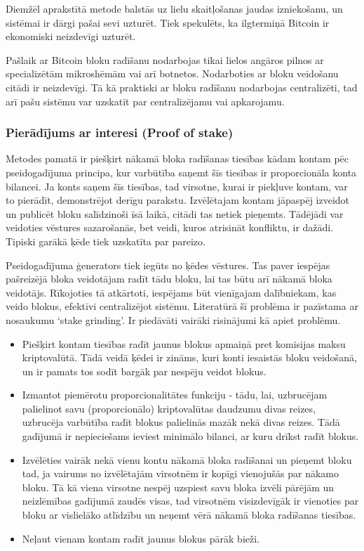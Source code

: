 Diemžēl aprakstītā metode balstās uz lielu skaitļošanas jaudas izniekošanu, un sistēmai ir dārgi pašai sevi uzturēt. Tiek spekulēts, ka ilgtermiņā Bitcoin ir ekonomiski neizdevīgi uzturēt. %

Pašlaik ar Bitcoin bloku radīšanu nodarbojas tikai lielos angāros pilnos ar specializētām mikroshēmām vai arī botnetos. Nodarboties ar bloku veidošanu citādi ir neizdevīgi. Tā kā praktiski ar bloku radīšanu nodarbojas centralizēti, tad arī pašu sistēmu var uzskatīt par centralizējamu vai apkarojamu.

\subsubsection{Pierādījums ar interesi (Proof of stake)}
Metodes pamatā ir piešķirt nākamā bloka radīšanas tiesības kādam kontam pēc pseidogadījuma principa, kur varbūtība saņemt šīs tiesības ir proporcionāla konta bilancei. Ja konts saņem šīs tiesības, tad virsotne, kurai ir piekļuve kontam, var to pierādīt, demonstrējot derīgu parakstu. Izvēlētajam kontam jāpaspēj izveidot un publicēt bloku salīdzinoši īsā laikā, citādi tas netiek pieņemts. Tādējādi var veidoties vēstures sazarošanās, bet veidi, kuros atrisināt konfliktu, ir dažādi. Tipiski garākā ķēde tiek uzskatīta par pareizo.

Pseidogadījuma ģenerators tiek iegūts no ķēdes vēstures. Tas paver iespējas pašreizējā bloka veidotājam radīt tādu bloku, lai tas būtu arī nākamā bloka veidotājs. Rīkojoties tā atkārtoti, iespējams būt vienīgajam dalībniekam, kas veido blokus, efektīvi centralizējot sistēmu. Literatūrā šī problēma ir pazīstama ar nosaukumu `stake grinding'. Ir piedāvāti vairāki risinājumi kā apiet problēmu.\cite{popov16,dannen17}
\begin{itemize}
    \item Piešķirt kontam tiesības radīt jaunus blokus apmaiņā pret komisijas maksu kriptovalūtā. 
    Tādā veidā ķēdei ir zināms, kuri konti iesaistās bloku veidošanā, un ir pamats tos sodīt bargāk par nespēju veidot blokus.
    \item Izmantot piemērotu proporcionalitātes funkciju - tādu, lai, uzbrucējam palielinot savu (proporcionālo) kriptovalūtas daudzumu divas reizes, uzbrucēja varbūtība radīt blokus palielinās mazāk nekā divas reizes.\cite{popov16} Tādā gadījumā ir nepieciešams ieviest minimālo bilanci, ar kuru drīkst radīt blokus.
    \item Izvēlēties vairāk nekā vienu kontu nākamā bloka radīšanai un pieņemt bloku tad, ja vairums no izvēlētajām virsotnēm ir kopīgi vienojušās par nākamo bloku. Tā kā viena virsotne nespēj uzspiest savu bloka izvēli pārējām un neizlēmības gadījumā zaudēs visas, tad virsotnēm visizdevīgāk ir vienoties par bloku ar vislielāko atlīdzību un neņemt vērā nākamā bloka radīšanas tiesības.
    \item Neļaut vienam kontam radīt jaunus blokus pārāk bieži.
\end{itemize}

